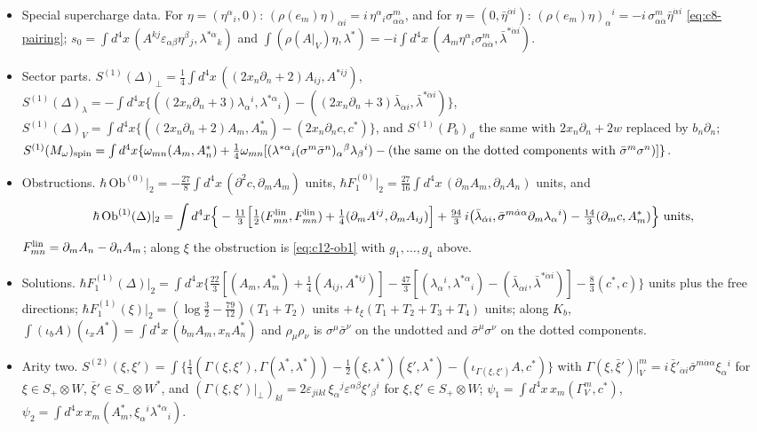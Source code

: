 \begin{remark}
\begin{itemize}
\item Special supercharge data. For $\eta=(\eta^\alpha{}_i,0)$: $(\rho(e_m)\eta)_{\dot\alpha i}=i\,\eta^\alpha{}_i\sigma^m_{\alpha\dot\alpha}$, and for $\eta=(0,\bar\eta^{\dot\alpha i})$: $(\rho(e_m)\eta)_\alpha{}^i=-i\,\sigma^m_{\alpha\dot\alpha}\bar\eta^{\dot\alpha i}$ \eqref{eq:c8-pairing}; $s_0=\int d^4x\,(A^{kj}\varepsilon_{\alpha\beta}\eta^\beta{}_j,\lambda^{*\alpha}{}_k)$ and $\int(\rho(A|_V)\eta,\lambda^*)=-i\int d^4x\,(A_m\eta^\alpha{}_i\sigma^m_{\alpha\dot\alpha},\bar\lambda^{*\dot\alpha i})$.
\item Sector parts. $S^{(1)}(\Delta)_\perp=\tfrac14\int d^4x\,((2x_n\partial_n+2)A_{ij},A^{*ij})$, $S^{(1)}(\Delta)_\lambda=-\int d^4x\{((2x_n\partial_n+3)\lambda_\alpha{}^i,\lambda^{*\alpha}{}_i)-((2x_n\partial_n+3)\bar\lambda_{\dot\alpha i},\bar\lambda^{*\dot\alpha i})\}$, $S^{(1)}(\Delta)_V=\int d^4x\{((2x_n\partial_n+2)A_m,A^*_m)-(2x_n\partial_nc,c^*)\}$, and $S^{(1)}(P_b)_d$ the same with $2x_n\partial_n+2w$ replaced by $b_n\partial_n$; $S^{(1)}(M_\omega)_{\rm spin}=\int d^4x\{\omega_{mn}(A_m,A^*_n)+\tfrac14\omega_{mn}[(\lambda^{*\alpha}{}_i(\sigma^m\bar\sigma^n)_\alpha{}^\beta\lambda_\beta{}^i)-(\text{the same on the dotted components with }\bar\sigma^m\sigma^n)]\}$.
\item Obstructions. $\hbar\,\mathrm{Ob}^{(0)}|_2=-\tfrac{27}8\int d^4x\,(\partial^2c,\partial_mA_m)$ units, $\hbar F_1^{(0)}|_2=\tfrac{27}{16}\int d^4x\,(\partial_mA_m,\partial_nA_n)$ units, and
\[
\hbar\,\mathrm{Ob}^{(1)}(\Delta)|_2=\int d^4x\Big\{-\tfrac{11}3\Big[\tfrac12(F^{\rm lin}_{mn},F^{\rm lin}_{mn})+\tfrac14(\partial_mA^{ij},\partial_mA_{ij})\Big]+\tfrac{94}3\,i\big(\bar\lambda_{\dot\alpha i},\bar\sigma^{m\dot\alpha\alpha}\partial_m\lambda_\alpha{}^i\big)-\tfrac{14}3(\partial_mc,A^*_m)\Big\}\ \text{units},
\]
$F^{\rm lin}_{mn}=\partial_mA_n-\partial_nA_m$; along $\xi$ the obstruction is \eqref{eq:c12-ob1} with $g_1,\dots,g_4$ above.
\item Solutions. $\hbar F_1^{(1)}(\Delta)|_2=\int d^4x\{\tfrac{22}3[(A_m,A^*_m)+\tfrac14(A_{ij},A^{*ij})]-\tfrac{47}3[(\lambda_\alpha{}^i,\lambda^{*\alpha}{}_i)-(\bar\lambda_{\dot\alpha i},\bar\lambda^{*\dot\alpha i})]-\tfrac83(c^*,c)\}$ units plus the free directions; $\hbar F_1^{(1)}(\xi)|_2=(\log\tfrac32-\tfrac{79}{12})(T_1+T_2)$ units $+\,t_\xi(T_1+T_2+T_3+T_4)$ units; along $K_b$, $\int(\iota_bA)(\iota_xA^*)=\int d^4x\,(b_mA_m,x_nA^*_n)$ and $\rho_\mu\rho_\nu$ is $\sigma^\mu\bar\sigma^\nu$ on the undotted and $\bar\sigma^\mu\sigma^\nu$ on the dotted components.
\item Arity two. $S^{(2)}(\xi,\xi')=\int\{\tfrac14(\Gamma(\xi,\xi'),\Gamma(\lambda^*,\lambda^*))-\tfrac12(\xi,\lambda^*)(\xi',\lambda^*)-(\iota_{\Gamma(\xi,\xi')}A,c^*)\}$ with $\Gamma(\xi,\bar\xi')|_V^m=i\,\bar\xi'_{\dot\alpha i}\bar\sigma^{m\dot\alpha\alpha}\xi_\alpha{}^i$ for $\xi\in S_+\otimes W$, $\bar\xi'\in S_-\otimes W^*$, and $(\Gamma(\xi,\xi')|_\perp)_{kl}=2\varepsilon_{jikl}\,\xi_\alpha{}^j\varepsilon^{\alpha\beta}\xi'_\beta{}^i$ for $\xi,\xi'\in S_+\otimes W$; $\psi_1=\int d^4x\,x_m(\Gamma^m_V,c^*)$, $\psi_2=\int d^4x\,x_m(A^*_m,\xi_\alpha{}^i\lambda^{*\alpha}{}_i)$.

\end{itemize}
\end{remark}
